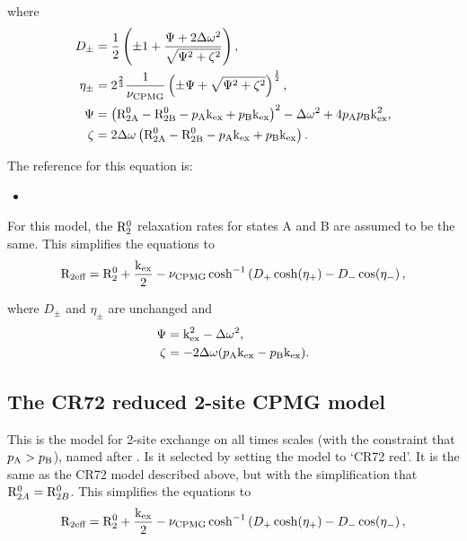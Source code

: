 where
\begin{align}
    D_\pm    &= \frac{1}{2} \left( \pm1 + \frac{\Psi + 2\Delta\omega^2}{\sqrt{\Psi^2 + \zeta^2}} \right) , \\
    \eta_\pm &= 2^{\frac{2}{3}}\frac{1}{\nu_\textrm{CPMG}} \left( \pm\Psi + \sqrt{\Psi^2 + \zeta^2} \right)^{\frac{1}{2}} , \\
    \Psi     &= \left( \textrm{R}_\textrm{2A}^0 - \textrm{R}_\textrm{2B}^0 - p_\textrm{A}\textrm{k}_\textrm{ex} + p_\textrm{B}\textrm{k}_\textrm{ex} \right)^2 - \Delta\omega^2 + 4p_\textrm{A}p_\textrm{B}\textrm{k}_\textrm{ex}^2 , \\
    \zeta    &= 2\Delta\omega \left( \textrm{R}_\textrm{2A}^0 - \textrm{R}_\textrm{2B}^0 - p_\textrm{A}\textrm{k}_\textrm{ex} + p_\textrm{B}\textrm{k}_\textrm{ex} \right).
\end{align}

The reference for this equation is:
\begin{itemize}
\item {}
\end{itemize}

For this model, the $\mathrm{R}_2^0$ relaxation rates for states A and B are assumed to be the same.  This simplifies the equations to
\begin{equation}
    \mathrm{R}_{2\textrm{eff}} = \mathrm{R}_2^0 + \frac{\textrm{k}_\textrm{ex}}{2} - \nu_\textrm{CPMG}\cosh^{-1} \left( D_+\cosh(\eta_+) - D_-\cos(\eta_- \right) ,
\end{equation}

where $D_\pm$ and $\eta_\pm$ are unchanged and
\begin{align}
    \Psi  &= \textrm{k}_\textrm{ex}^2 - \Delta\omega^2 , \\
    \zeta &= -2\Delta\omega (p_\textrm{A}\textrm{k}_\textrm{ex} - p_\textrm{B}\textrm{k}_\textrm{ex}) .
\end{align}




\subsection{The CR72 reduced 2-site CPMG model}
\label{sect: dispersion: CR72 red model}

This is the model for 2-site exchange on all times scales (with the constraint that $p_\textrm{A} > p_\textrm{B}$), named after \citet{CarverRichards72}.
Is it selected by setting the model to `CR72 red'.
It is the same as the CR72 model described above, but with the simplification that $\mathrm{R}_{2A}^0 = \mathrm{R}_{2B}^0$.
This simplifies the equations to
\begin{equation}
    \mathrm{R}_{2\textrm{eff}} = \mathrm{R}_2^0 + \frac{\textrm{k}_\textrm{ex}}{2} - \nu_\textrm{CPMG}\cosh^{-1} \left( D_+\cosh(\eta_+) - D_-\cos(\eta_- \right) ,
\end{equation}

